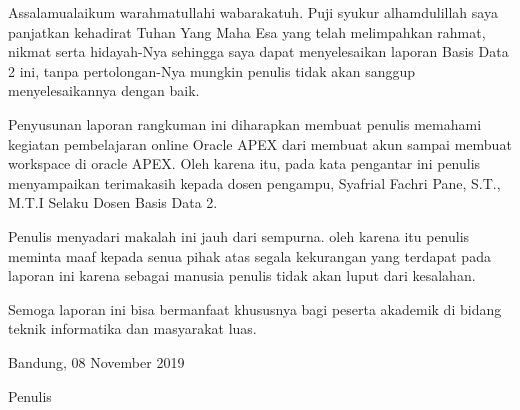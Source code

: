\begin{acknowledgements}
Assalamualaikum warahmatullahi wabarakatuh. Puji syukur alhamdulillah saya panjatkan kehadirat Tuhan Yang Maha Esa yang telah melimpahkan rahmat, nikmat serta hidayah-Nya sehingga saya dapat menyelesaikan laporan Basis Data 2 ini, tanpa pertolongan-Nya mungkin penulis tidak akan sanggup menyelesaikannya dengan baik.

Penyusunan laporan rangkuman ini diharapkan membuat penulis memahami kegiatan pembelajaran online Oracle APEX dari membuat akun sampai membuat workspace di oracle APEX. Oleh karena itu, pada kata pengantar ini penulis menyampaikan terimakasih kepada dosen pengampu, Syafrial Fachri Pane, S.T., M.T.I Selaku Dosen Basis Data 2.

Penulis menyadari makalah ini jauh dari sempurna. oleh karena itu penulis meminta maaf kepada senua pihak atas segala kekurangan yang terdapat pada laporan ini karena sebagai manusia penulis tidak akan luput dari kesalahan.

Semoga laporan ini bisa bermanfaat khususnya bagi peserta akademik di bidang teknik informatika dan masyarakat luas.

\begin{raggedleft}

Bandung, 08 November 2019

Penulis

\end{raggedleft}

\end{acknowledgements}